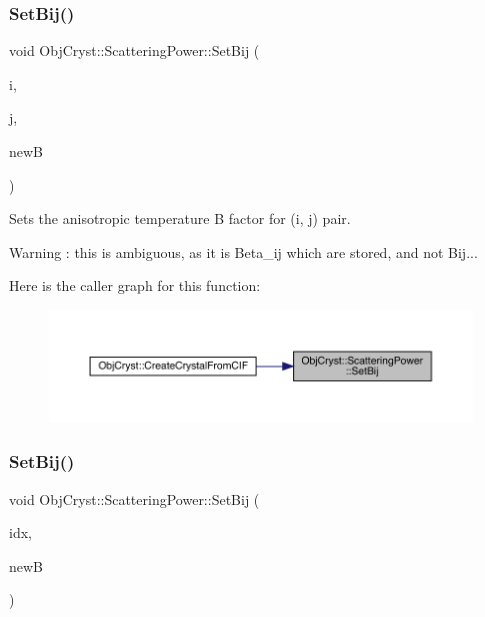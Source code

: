 \subsubsection{\texorpdfstring{SetBij()}{SetBij()}\hspace{0.1cm}{\footnotesize\ttfamily [1/2]}}
{\footnotesize\ttfamily void Obj\+Cryst\+::\+Scattering\+Power\+::\+Set\+Bij (\begin{DoxyParamCaption}\item[{const size\+\_\+t \&}]{i,  }\item[{const size\+\_\+t \&}]{j,  }\item[{const R\+E\+AL}]{newB }\end{DoxyParamCaption})\hspace{0.3cm}{\ttfamily [virtual]}}



Sets the anisotropic temperature B factor for (i, j) pair. 

\begin{DoxyWarning}{Warning}
\+: this is ambiguous, as it is Beta\+\_\+ij which are stored, and not Bij... 
\end{DoxyWarning}
Here is the caller graph for this function\+:
\nopagebreak
\begin{figure}[H]
\begin{center}
\leavevmode
\includegraphics[width=350pt]{class_obj_cryst_1_1_scattering_power_aee5ad2e8325feea42430bd1ed54eabfc_icgraph}
\end{center}
\end{figure}
\mbox{\label{class_obj_cryst_1_1_scattering_power_a7f5d987bea1be793bf8e9d6951357c3e}} 
\subsubsection{\texorpdfstring{SetBij()}{SetBij()}\hspace{0.1cm}{\footnotesize\ttfamily [2/2]}}
{\footnotesize\ttfamily void Obj\+Cryst\+::\+Scattering\+Power\+::\+Set\+Bij (\begin{DoxyParamCaption}\item[{const size\+\_\+t \&}]{idx,  }\item[{const R\+E\+AL}]{newB }\end{DoxyParamCaption})\hspace{0.3cm}{\ttfamily [virtual]}}



